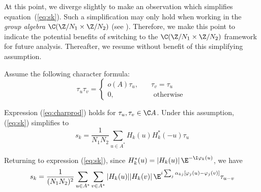 \begin{center}\setlength{\fboxsep}{4mm}\begin{boxedminipage}[t]{16cm}
\begin{remark} 
{\small At this point, we diverge slightly to make an observation which
simplifies equation~(\ref{eq:sk}).  Such a simplification may
only hold when working in the \emph{group algebra} $\C(\Z/N_1 \times \Z/N_2)$
(see \cite{Tolimieri:2003}).  Therefore, we make this point to indicate the
potential benefits of switching to the $\C(\Z/N_1 \times \Z/N_2)$ framework
for future analysis.  Thereafter, we resume without benefit of this
simplifying assumption.

Assume the following character formula:
\begin{equation}\label{eq:charprod}
\tau_u\tau_v = \left\{ \begin{array}{ll} o(A)\tau_u, &\quad \tau_v = \tau_u\\
                                         0, &\quad \text{ otherwise }
                       \end{array}\right.
\end{equation}

Expression (\ref{eq:charprod}) holds for $\tau_u, \tau_v \in \C A$.
Under this assumption, (\ref{eq:sk}) simplifies to
\[
s_k = \frac{1}{N_1N_2}\sum_{u\in A^*} H_k(u)H_k^*(-u)\tau_{u}
\]}
\end{remark}
\end{boxedminipage}\end{center}

Returning to expression (\ref{eq:sk}), since $H_k^*(u) =
|H_k(u)|\,\E^{-\I \varphi_k(u)}$, we have 
\begin{equation}\label{eq:m7}
s_k = 
\frac{1}{(N_1N_2)^2} \sum_{u\in A^*} \sum_{v\in A^*} |H_k(u)||H_k(v)|
\,\E^{ i\sum_j \alpha_{kj}[\varphi_j(u)-\varphi_j(v)]}\tau_{u-v}
\end{equation}

